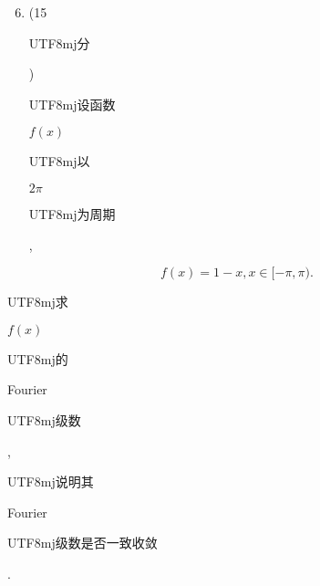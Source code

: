 \documentclass[10pt]{article}
\begin{document}
\begin{enumerate}
  \setcounter{enumi}{5}
  \item (15 \begin{CJK}{UTF8}{mj}分\end{CJK}) \begin{CJK}{UTF8}{mj}设函数\end{CJK} $f(x)$ \begin{CJK}{UTF8}{mj}以\end{CJK} $2 \pi$ \begin{CJK}{UTF8}{mj}为周期\end{CJK},
\end{enumerate}
$$
f(x)=1-x, x \in[-\pi, \pi) .
$$
\begin{CJK}{UTF8}{mj}求\end{CJK} $f(x)$ \begin{CJK}{UTF8}{mj}的\end{CJK} Fourier \begin{CJK}{UTF8}{mj}级数\end{CJK}, \begin{CJK}{UTF8}{mj}说明其\end{CJK} Fourier \begin{CJK}{UTF8}{mj}级数是否一致收敛\end{CJK}.
\end{document}

